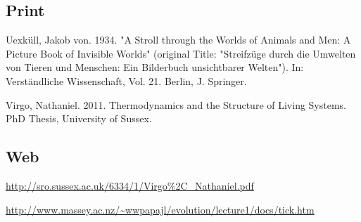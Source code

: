 \documentclass[11pt]{article}
\begin{document}
\subsection{Print}
\label{sec:orgff565ad}

Uexküll, Jakob von. 1934.  "A Stroll through the Worlds of Animals and Men: A Picture Book of Invisible Worlds" (original Title: "Streifzüge durch die Umwelten von Tieren und Menschen: Ein Bilderbuch unsichtbarer Welten"). In: Verständliche Wissenschaft, Vol. 21. Berlin, J. Springer.

Virgo, Nathaniel. 2011. Thermodynamics and the Structure of Living Systems. PhD Thesis, University of Sussex.

\subsection{Web}
\label{sec:org479d57e}

\url{http://sro.sussex.ac.uk/6334/1/Virgo\%2C\_Nathaniel.pdf}

\url{http://www.massey.ac.nz/\~wwpapajl/evolution/lecture1/docs/tick.htm}
\end{document}
